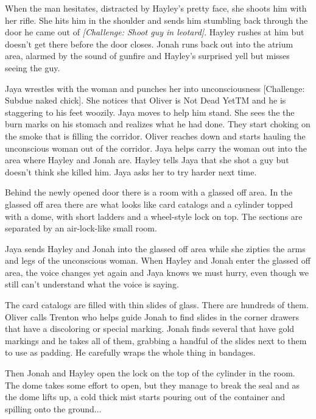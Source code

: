 When the man hesitates, distracted by Hayley's pretty face, she shoots him with her rifle.  She hits him in the shoulder and sends him stumbling back through the door he came out of \textit{{[}Challenge: Shoot guy in leotard{]}}.  Hayley rushes at him but doesn't get there before the door closes.  Jonah runs back out into the atrium area, alarmed by the sound of gunfire and Hayley's surprised yell but misses seeing the guy.



Jaya wrestles with the woman and punches her into unconsciousness {[}Challenge: Subdue naked chick{]}.  She notices that Oliver is Not Dead YetTM and he is staggering to his feet woozily.  Jaya moves to help him stand.  She sees the the burn marks on his stomach and realizes what he had done.  They start choking on the smoke that is filling the corridor.  Oliver reaches down and starts hauling the unconscious woman out of the corridor.  Jaya helps carry the woman out into the area where Hayley and Jonah are.  Hayley tells Jaya that she shot a guy but doesn't think she killed him.  Jaya asks her to try harder next time.



Behind the newly opened door there is a room with a glassed off area.  In the glassed off area there are what looks like card catalogs and a cylinder topped with a dome, with short ladders and a wheel-style lock on top.  The sections are separated by an air-lock-like small room.



Jaya sends Hayley and Jonah into the glassed off area while she zipties the arms and legs of the unconscious woman.  When Hayley and Jonah enter the glassed off area, the voice changes yet again and Jaya knows we must hurry, even though we still can't understand what the voice is saying.



The card catalogs are filled with thin slides of glass.  There are hundreds of them.  Oliver calls Trenton who helps guide Jonah to find slides in the corner drawers that have a discoloring or special marking.  Jonah finds several that have gold markings and he takes all of them, grabbing a handful of the slides next to them to use as padding.  He carefully wraps the whole thing in bandages.



Then Jonah and Hayley open the lock on the top of the cylinder in the room.  The dome takes some effort to open, but they manage to break the seal and as the dome lifts up, a cold thick mist starts pouring out of the container and spilling onto the ground...





